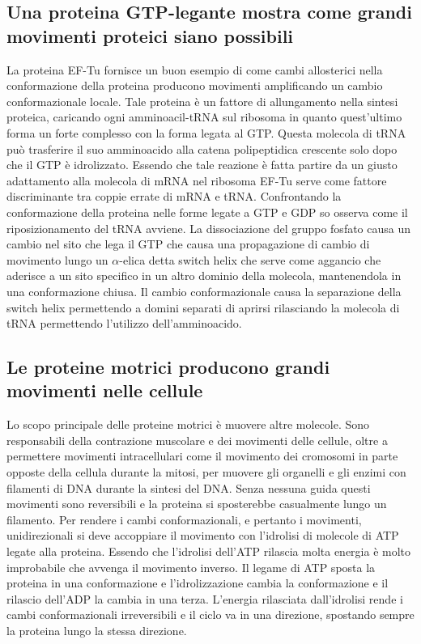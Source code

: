 \subsection{Una proteina GTP-legante mostra come grandi movimenti proteici siano possibili}
La proteina EF-Tu fornisce un buon esempio di come cambi allosterici nella conformazione della proteina producono movimenti amplificando un cambio conformazionale locale. Tale proteina
\`e un fattore di allungamento nella sintesi proteica, caricando ogni amminoacil-tRNA sul ribosoma in quanto quest'ultimo forma un forte complesso con la forma legata al GTP. Questa 
molecola di tRNA pu\`o trasferire il suo amminoacido alla catena polipeptidica crescente solo dopo che il GTP \`e idrolizzato. Essendo che tale reazione \`e fatta partire da un giusto
adattamento alla molecola di mRNA nel ribosoma EF-Tu serve come fattore discriminante tra coppie errate di mRNA e tRNA. Confrontando la conformazione della proteina nelle forme legate
a GTP e GDP so osserva come il riposizionamento del tRNA avviene. La dissociazione del gruppo fosfato causa un cambio nel sito che lega il GTP che causa una propagazione di cambio di 
movimento lungo un $\alpha$-elica detta switch helix che serve come aggancio che aderisce a un sito specifico in un altro dominio della molecola, mantenendola in una conformazione 
chiusa. Il cambio conformazionale causa la separazione della switch helix permettendo a domini separati di aprirsi rilasciando la molecola di tRNA permettendo l'utilizzo 
dell'amminoacido. 
\subsection{Le proteine motrici producono grandi movimenti nelle cellule}
Lo scopo principale delle proteine motrici \`e muovere altre molecole. Sono responsabili della contrazione muscolare e dei movimenti delle cellule, oltre a permettere movimenti 
intracellulari come il movimento dei cromosomi in parte opposte della cellula durante la mitosi, per muovere gli organelli e gli enzimi con filamenti di DNA durante la sintesi del DNA. 
Senza nessuna guida questi movimenti sono reversibili e la proteina si sposterebbe casualmente lungo un filamento. Per rendere i cambi conformazionali, e pertanto i movimenti, 
unidirezionali si deve accoppiare il movimento con l'idrolisi di molecole di ATP legate alla proteina. Essendo che l'idrolisi dell'ATP rilascia molta energia \`e molto improbabile che
avvenga il movimento inverso. Il legame di ATP sposta la proteina in una conformazione e l'idrolizzazione cambia la conformazione e il rilascio dell'ADP la cambia in una terza. L'energia
rilasciata dall'idrolisi rende i cambi conformazionali irreversibili e il ciclo va in una direzione, spostando sempre la proteina lungo la stessa direzione. 
